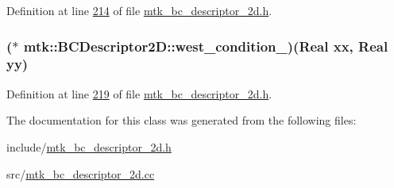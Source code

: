 Definition at line \hyperlink{mtk__bc__descriptor__2d_8h_source_l00214}{214} of file \hyperlink{mtk__bc__descriptor__2d_8h_source}{mtk\+\_\+bc\+\_\+descriptor\+\_\+2d.\+h}.

\hypertarget{classmtk_1_1BCDescriptor2D_a2d4af48b3408658c7ace6eeb74464c9f}{
\subsubsection[{west\+\_\+condition\+\_\+}]{($\ast$ mtk\+::\+B\+C\+Descriptor2\+D\+::west\+\_\+condition\+\_\+)({\bf Real} xx, {\bf Real} yy)\hspace{0.3cm}{\ttfamily [private]}}}\label{classmtk_1_1BCDescriptor2D_a2d4af48b3408658c7ace6eeb74464c9f}


Definition at line \hyperlink{mtk__bc__descriptor__2d_8h_source_l00219}{219} of file \hyperlink{mtk__bc__descriptor__2d_8h_source}{mtk\+\_\+bc\+\_\+descriptor\+\_\+2d.\+h}.



The documentation for this class was generated from the following files\+:\begin{DoxyCompactItemize}
\item 
include/\hyperlink{mtk__bc__descriptor__2d_8h}{mtk\+\_\+bc\+\_\+descriptor\+\_\+2d.\+h}\item 
src/\hyperlink{mtk__bc__descriptor__2d_8cc}{mtk\+\_\+bc\+\_\+descriptor\+\_\+2d.\+cc}\end{DoxyCompactItemize}
